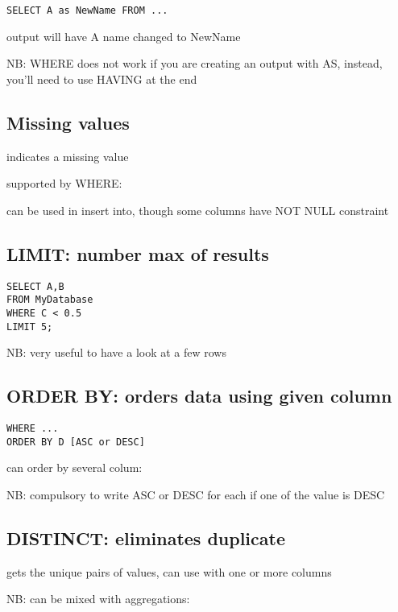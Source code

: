 \begin{lstlisting}
SELECT A as NewName FROM ...
\end{lstlisting}

		output will have A name changed to NewName

		NB: WHERE does not work if you are creating an output with AS, instead, you'll need to use HAVING at the end

	\subsection{Missing values}

		 indicates a missing value

		supported by WHERE: 

		can be used in insert into, though some  columns have NOT NULL constraint

		\subsection{LIMIT: number max of results}

\begin{lstlisting}
SELECT A,B
FROM MyDatabase
WHERE C < 0.5
LIMIT 5;
\end{lstlisting}

	NB: very useful to have a look at a few rows

	\subsection{ORDER BY: orders data using given column}

\begin{lstlisting}
WHERE ...
ORDER BY D [ASC or DESC]
\end{lstlisting}

		can  order by several colum: 

		NB: compulsory to write ASC  or DESC for each if one of the value is DESC

	\subsection{DISTINCT: eliminates duplicate}

		 gets the unique pairs of values, can use with one or more columns
		
		NB: can be mixed with aggregations: 

